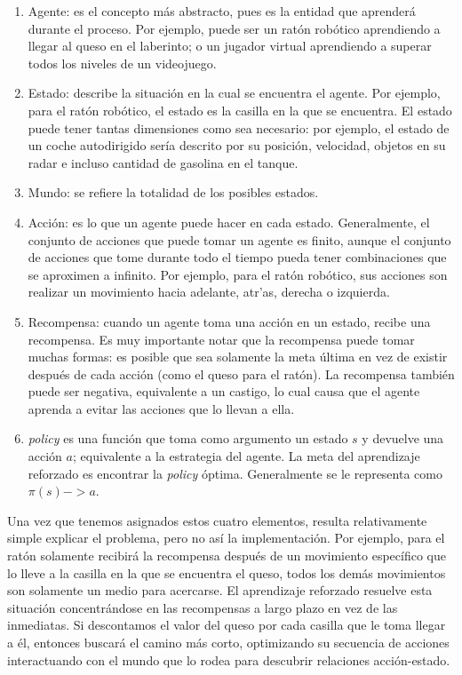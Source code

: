 \begin{enumerate}
    \item Agente: es el concepto m\'as abstracto, pues es la entidad que aprender\'a durante el proceso. Por ejemplo, puede ser un rat\'on rob\'otico aprendiendo a llegar al queso en el laberinto; o un jugador virtual aprendiendo a superar todos los niveles de un videojuego.
    \item Estado: describe la situaci\'on en la cual se encuentra el agente. Por ejemplo, para el rat\'on rob\'otico, el estado es la casilla en la que se encuentra. El estado puede tener tantas dimensiones como sea necesario: por ejemplo, el estado de un coche autodirigido ser\'ia descrito por su posici\'on, velocidad, objetos en su radar e incluso cantidad de gasolina en el tanque.
    \item Mundo: se refiere la totalidad de los posibles estados.
    \item Acci\'on: es lo que un agente puede hacer en cada estado. Generalmente, el conjunto de acciones que puede tomar un agente es finito, aunque el conjunto de acciones que tome durante todo el tiempo pueda tener combinaciones que se aproximen a infinito. Por ejemplo, para el rat\'on rob\'otico, sus acciones son realizar un movimiento hacia adelante, atr'as, derecha o izquierda.
    \item Recompensa: cuando un agente toma una acci\'on en un estado, recibe una recompensa. Es muy importante notar que la recompensa puede tomar muchas formas: es posible que sea solamente la meta \'ultima en vez de existir despu\'es de cada acci\'on (como el queso para el rat\'on). La recompensa tambi\'en puede ser negativa, equivalente a un castigo, lo cual causa que el agente aprenda a evitar las acciones que lo llevan a ella.
    \item \textit{policy} es una funci\'on que toma como argumento un estado $s$ y devuelve una acci\'on $a$; equivalente a la estrategia del agente. La meta del aprendizaje reforzado es encontrar la \textit{policy} \'optima. Generalmente se le representa como $\pi(s)->a$.
\end{enumerate}

Una vez que tenemos asignados estos cuatro elementos, resulta relativamente simple explicar el problema, pero no as\'i la implementaci\'on. Por ejemplo, para el rat\'on solamente recibir\'a la recompensa despu\'es de un movimiento espec\'ifico que lo lleve a la casilla en la que se encuentra el queso, todos los dem\'as movimientos son solamente un medio para acercarse. El aprendizaje reforzado resuelve esta situaci\'on concentr\'andose en las recompensas a largo plazo en vez de las inmediatas. Si descontamos el valor del queso por cada casilla que le toma llegar a \'el, entonces buscar\'a el camino m\'as corto, optimizando su secuencia de acciones interactuando con el mundo que lo rodea para descubrir relaciones acci\'on-estado.\\

